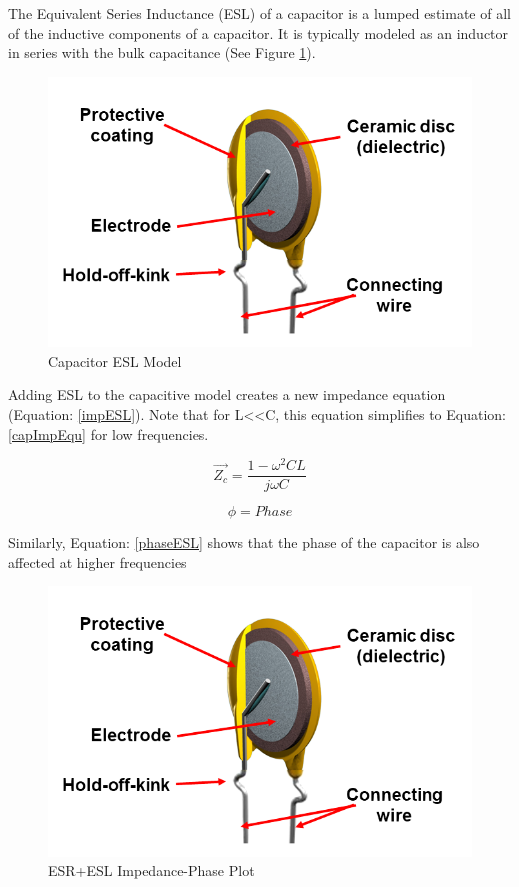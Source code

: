 The Equivalent Series Inductance (ESL) of a capacitor is a lumped estimate of all of the inductive components of a capacitor. It is typically modeled as an inductor in series with the bulk capacitance (See Figure \ref{capESLModelFig}).

\begin{figure}
    \includegraphics[keepaspectratio=true,scale=.5]{./figures/testImage.png}
    \centering
    \caption{Capacitor ESL Model}
    \label{capESLModelFig}
\end{figure}

Adding ESL to the capacitive model creates a new impedance equation (Equation: \eqref{impESL}). Note that for L\textless \textless C, this equation simplifies to Equation: \eqref{capImpEqu} for low frequencies.

\begin{equation}
\label{impESL}
\vec{Z_c} = \frac{1-\omega ^2CL}{j\omega C}
\end{equation}

\begin{equation}
\label{phaseESL}
\phi = Phase
\end{equation}

Similarly, Equation: \eqref{phaseESL} shows that the phase of the capacitor is also affected at higher frequencies

\begin{figure}
    \includegraphics[keepaspectratio=true,scale=.5]{./figures/testImage.png}
    \centering
    \caption{ESR+ESL Impedance-Phase Plot}
    \label{capESLPlot}
\end{figure}

